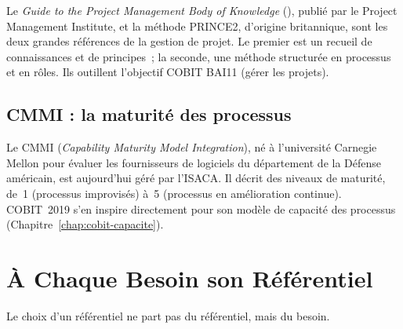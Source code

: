 Le \textit{Guide to the Project Management Body of Knowledge}
(), publié par le Project Management Institute, et la
méthode PRINCE2, d'origine britannique, sont les deux grandes références
de la gestion de projet. Le premier est un recueil de connaissances et de
principes~; la seconde, une méthode structurée en processus et en rôles.
Ils outillent l'objectif COBIT BAI11 (gérer les projets).

\subsection{CMMI : la maturité des processus}

Le CMMI (\textit{Capability Maturity Model Integration}), né à
l'université Carnegie Mellon pour évaluer les fournisseurs de logiciels du
département de la Défense américain, est aujourd'hui géré par l'ISACA. Il
décrit des niveaux de maturité, de~1 (processus improvisés) à~5
(processus en amélioration continue). COBIT~2019 s'en inspire directement
pour son modèle de capacité des processus (Chapitre~\ref{chap:cobit-capacite}).

\section{À Chaque Besoin son Référentiel}
\label{sec:c04-besoins}

Le choix d'un référentiel ne part pas du référentiel, mais du besoin.

